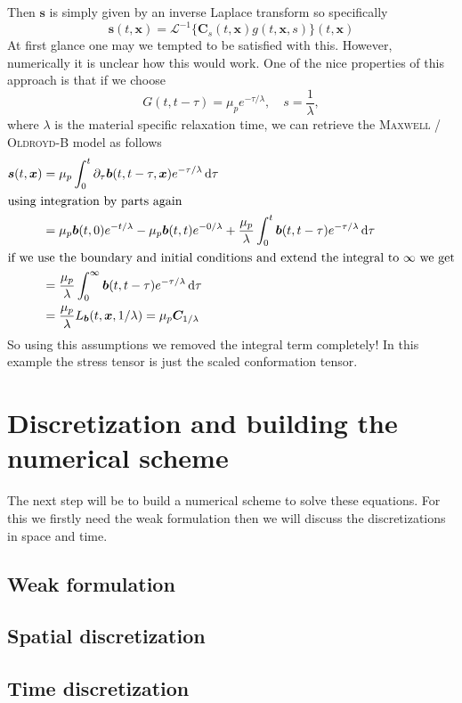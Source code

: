 \documentclass[12pt,a4paper]{scrartcl}
\numberwithin{equation}{section} %
\theoremstyle{definition}
\theoremstyle{plain}
\newcommand{\bfb}{\bm{b}}
\newcommand{\bfs}{\bm{s}}
\newcommand{\bfC}{\bm{C}}
\newcommand{\bfx}{\bm{x}}
\newcommand{\D}{\mathop{}\!\mathrm{d}}
\begin{document}
Then $\bfs$ is simply given by an inverse Laplace transform so specifically
\begin{equation}
    \bfs(t,\bfx) =\mathcal{L}^{-1}\{\bfC_s(t,\bfx)g(t,\bfx,s)\}(t,\bfx)
\end{equation}
At first glance one may we tempted to be satisfied with this. However, numerically it is unclear how this would work. One of the nice properties of this approach is that if we choose 
\begin{equation}
    G(t,t-\tau)= \mu_p e^{-\tau/\lambda},\quad s=\frac{1}{\lambda},
\end{equation}
where $\lambda$ is the material specific relaxation time, we can retrieve the \textsc{Maxwell} / \textsc{Oldroyd}-B model as follows
\begin{align}
    \bfs(t,\bfx)&=\mu_p\int_0^t\partial_\tau\bfb(t,t-\tau,\bfx)e^{-\tau/\lambda}\D\tau\\
    \intertext{using integration by parts again}
    &=\mu_p\bfb(t,0)e^{-t/\lambda}-\mu_p\bfb(t,t)e^{-0/\lambda}+\frac{\mu_p}{\lambda}\int_0^t\bfb(t,t-\tau)e^{-\tau/\lambda}\D\tau\\
    \intertext{if we use the boundary and initial conditions and extend the integral to $\infty$ we get}
    &=\frac{\mu_p}{\lambda}\int_0^\infty\bfb(t,t-\tau)e^{-\tau/\lambda}\D\tau\\
    &=\frac{\mu_p}{\lambda}L_{\bfb}(t,\bfx,1/\lambda) = \mu_p\bfC_{1/\lambda}
\end{align}
So using this assumptions we removed the integral term completely! In this example the stress tensor is just the scaled conformation tensor. 
\section{Discretization and building the numerical scheme}
The next step will be to build a numerical scheme to solve these equations. For this we firstly need the weak formulation then we will discuss the discretizations in space and time.
\subsection{Weak formulation}
\subsection{Spatial discretization}
\subsection{Time discretization}
\end{document}
